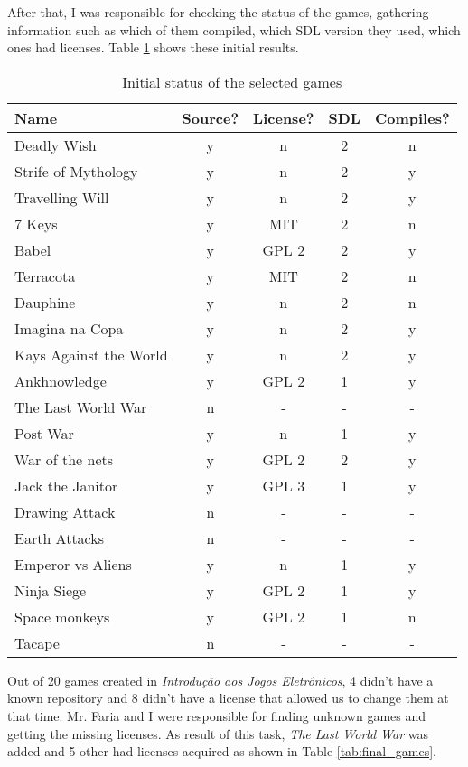 After that, I was responsible for checking the status of the games, gathering information such as which of them compiled, which SDL version they used, which ones had licenses. Table \ref{tab:first_games} shows these initial results.


\begin{table}[h!]
\centering
\caption{Initial status of the selected games}
\label{tab:first_games}
\begin{tabular}{lcccc}
\toprule
\textbf{Name} & \textbf{Source?} & \textbf{License?} & \textbf{SDL} & \textbf{Compiles?} \\
\midrule
Deadly Wish & y & n & 2 & n \\
Strife of Mythology & y & n & 2 & y \\
Travelling Will & y & n & 2 & y \\
7 Keys & y & MIT & 2 & n \\
Babel & y & GPL 2 & 2 & y \\
Terracota & y & MIT & 2 & n \\
Dauphine & y & n & 2 & n \\
Imagina na Copa & y & n & 2 & y \\
Kays Against the World & y & n & 2 & y \\
Ankhnowledge & y & GPL 2 & 1 & y \\
The Last World War & n & - & - & - \\
Post War & y & n & 1 & y \\
War of the nets & y & GPL 2 & 2 & y \\
Jack the Janitor & y & GPL 3 & 1 & y \\
Drawing Attack & n & - & - & - \\
Earth Attacks & n & - & - & - \\
Emperor vs Aliens & y & n & 1 & y \\
Ninja Siege & y & GPL 2 & 1 & y \\
Space monkeys & y & GPL 2 & 1 & n \\
Tacape & n & - & - & - \\
\bottomrule
\end{tabular}
\end{table}

Out of 20 games created in \textit{Introdu\c{c}\~ao aos Jogos Eletr\^onicos}, 4 didn't have a known repository and 8 didn't have a license that allowed us to change them at that time. Mr. Faria and I were responsible for finding unknown games and getting the missing licenses. As result of this task, \textit{The Last World War} was added and 5 other had licenses acquired as shown in Table \ref{tab:final_games}.

